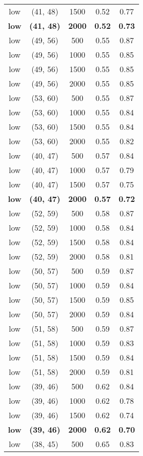 \begin{tabular}{c c c c c}
low & (41, 48) &  1500 & 0.52 & 0.77 \\
\textbf{low} & \textbf{(41, 48)} & \textbf{ 2000} & \textbf{0.52} & \textbf{0.73} \\
low & (49, 56) &  500 & 0.55 & 0.87 \\
low & (49, 56) &  1000 & 0.55 & 0.85 \\
low & (49, 56) &  1500 & 0.55 & 0.85 \\
low & (49, 56) &  2000 & 0.55 & 0.85 \\
low & (53, 60) &  500 & 0.55 & 0.87 \\
low & (53, 60) &  1000 & 0.55 & 0.84 \\
low & (53, 60) &  1500 & 0.55 & 0.84 \\
low & (53, 60) &  2000 & 0.55 & 0.82 \\
low & (40, 47) &  500 & 0.57 & 0.84 \\
low & (40, 47) &  1000 & 0.57 & 0.79 \\
low & (40, 47) &  1500 & 0.57 & 0.75 \\
\textbf{low} & \textbf{(40, 47)} & \textbf{ 2000} & \textbf{0.57} & \textbf{0.72} \\
low & (52, 59) &  500 & 0.58 & 0.87 \\
low & (52, 59) &  1000 & 0.58 & 0.84 \\
low & (52, 59) &  1500 & 0.58 & 0.84 \\
low & (52, 59) &  2000 & 0.58 & 0.81 \\
low & (50, 57) &  500 & 0.59 & 0.87 \\
low & (50, 57) &  1000 & 0.59 & 0.84 \\
low & (50, 57) &  1500 & 0.59 & 0.85 \\
low & (50, 57) &  2000 & 0.59 & 0.84 \\
low & (51, 58) &  500 & 0.59 & 0.87 \\
low & (51, 58) &  1000 & 0.59 & 0.83 \\
low & (51, 58) &  1500 & 0.59 & 0.84 \\
low & (51, 58) &  2000 & 0.59 & 0.81 \\
low & (39, 46) &  500 & 0.62 & 0.84 \\
low & (39, 46) &  1000 & 0.62 & 0.78 \\
low & (39, 46) &  1500 & 0.62 & 0.74 \\
\textbf{low} & \textbf{(39, 46)} & \textbf{ 2000} & \textbf{0.62} & \textbf{0.70} \\
low & (38, 45) &  500 & 0.65 & 0.83 \\

\end{tabular}
